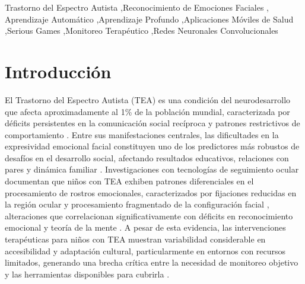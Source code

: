 \documentclass[3p,twocolumn,times]{elsarticle}
\begin{document}
\begin{frontmatter}
\begin{abstract}
			\smallskip\noindent\textbf{Datasets:} No aplicable (revisión sistemática).
			Todos los datos extraídos están disponibles en el repositorio público GitHub:
			https://github.com/Cris223511/systematic-review-data-analysis.
			\textbf{Licencia del Dataset:} No aplicable.
		\end{abstract}
		
		\begin{keyword}
			Trastorno del Espectro Autista \sep Reconocimiento de Emociones Faciales \sep
			Aprendizaje Automático \sep Aprendizaje Profundo \sep Aplicaciones Móviles de
			Salud \sep Serious Games \sep Monitoreo Terapéutico \sep Redes Neuronales
			Convolucionales
		\end{keyword}
		
	\end{frontmatter}
	
	\section{Introducción}\label{sec1}
	
	El Trastorno del Espectro Autista (TEA) es una condición del neurodesarrollo que
	afecta aproximadamente al 1\% de la población mundial, caracterizada por déficits
	persistentes en la comunicación social recíproca y patrones restrictivos de
	comportamiento \cite{Gungor2025}. Entre sus manifestaciones centrales, las
	dificultades en la expresividad emocional facial constituyen uno de los predictores
	más robustos de desafíos en el desarrollo social, afectando resultados educativos,
	relaciones con pares y dinámica familiar \cite{Johnson2025}. Investigaciones con
	tecnologías de seguimiento ocular documentan que niños con TEA exhiben patrones
	diferenciales en el procesamiento de rostros emocionales, caracterizados por
	fijaciones reducidas en la región ocular y procesamiento fragmentado de la
	configuración facial \cite{He2019}, alteraciones que correlacionan significativamente
	con déficits en reconocimiento emocional y teoría de la mente
	\cite{He2019,Reed2021,Lecciso2021}. A pesar de esta evidencia, las intervenciones
	terapéuticas para niños con TEA muestran variabilidad considerable en accesibilidad
	y adaptación cultural, particularmente en entornos con recursos limitados, generando
	una brecha crítica entre la necesidad de monitoreo objetivo y las herramientas
	disponibles para cubrirla \cite{Shaik2025}.
	
\end{document}
